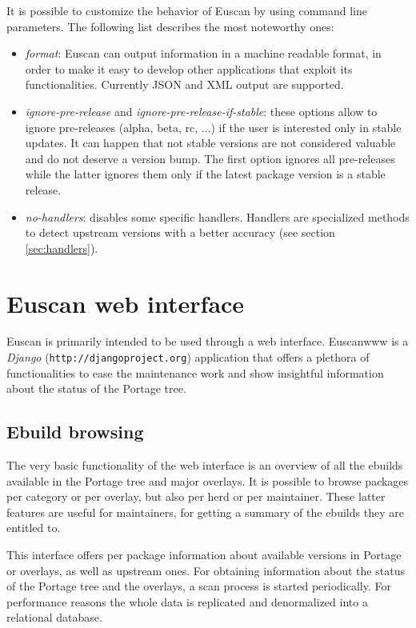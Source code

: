 It is possible to customize the behavior of Euscan by using command line parameters. The following list describes the most noteworthy ones:
\begin{itemize}
\item \emph{format}: Euscan can output information in a machine readable format, in order to make it easy to develop other applications that exploit its functionalities. Currently JSON and XML output are supported.
\item \emph{ignore-pre-release} and \emph{ignore-pre-release-if-stable}: these options allow to ignore pre-releases (alpha, beta, rc, ...) if the user is interested only in stable updates. It can happen that not stable versions are not considered valuable and do not deserve a version bump. The first option ignores all pre-releases while the latter ignores them only if the latest package version is a stable release.
\item \emph{no-handlers}: disables some specific handlers. Handlers are specialized methods to detect upstream versions with a better accuracy (see section \ref{sec:handlers}). 
\end{itemize}


\section{Euscan web interface}
Euscan is primarily intended to be used through a web interface. Euscanwww is a \emph{Django} (\texttt{http://djangoproject.org}) application that offers a plethora of functionalities to ease the maintenance work and show insightful information about the status of the Portage tree.

\subsection{Ebuild browsing}
The very basic functionality of the web interface is an overview of all the ebuilds available in the Portage tree and major overlays. It is possible to browse packages per category or per overlay, but also per herd or per maintainer. These latter features are useful for maintainers, for getting a summary of the ebuilds they are entitled to.

This interface offers per package information about available versions in Portage or overlays, as well as upstream ones.
For obtaining information about the status of the Portage tree and the overlays, a scan process is started periodically. For performance reasons the whole data is replicated and denormalized into a relational database.

